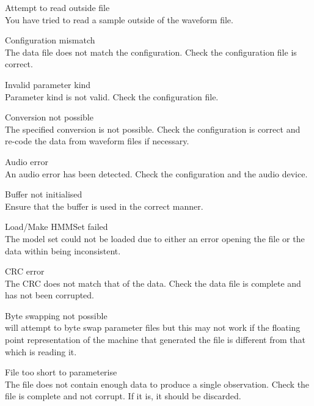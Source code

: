 \begin{itemize}
\begin{itemize}
    Attempt to read outside file\\
        You have tried to read a sample outside of the waveform file.

\end{itemize}


\begin{itemize}
    Configuration mismatch\\
        The data file does not match the configuration.  Check the 
        configuration file is correct.

    Invalid parameter kind\\
        Parameter kind is not valid.  Check the configuration file.

    Conversion not possible\\
        The specified conversion is not possible.  Check the configuration is
        correct and re-code the data from waveform files if necessary.

    Audio error\\
        An audio error has been detected.  Check the  
        configuration and the audio device.

    Buffer not initialised\\
        Ensure that the buffer is used in the correct manner.

    Load/Make HMMSet failed\\
        The model set could not be loaded due to either an error opening the
        file or the data within being inconsistent.

    CRC error\\
        The CRC does not match that of the data.  Check the data file is 
        complete and has not been corrupted.

    Byte swapping not possible\\
         will attempt to byte swap parameter files but this 
        may not work if the floating point representation of the machine 
        that generated the file is different from that which is reading it.

    File too short to parameterise\\
        The file does not contain enough data to produce a single observation.
        Check the file is complete and not corrupt.  If it is, it should be 
        discarded.


\end{itemize}
\end{itemize}
